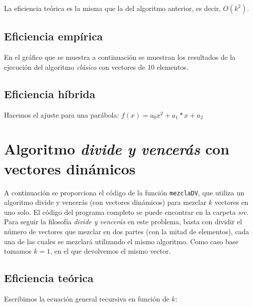 \documentclass[11pt]{article}
\begin{document}
 La eficiencia teórica es la misma que la del algoritmo anterior, es decir, $O(k^2)$.
 
 \subsection*{Eficiencia empírica}
 
 En el gráfico que se muestra a continuación se muestran los resultados de la
 ejecución del algoritmo \textit{clásico} con vectores de 10 elementos.
 
 \begin{center}
 	
 \end{center}
 
 \subsection*{Eficiencia híbrida}
 
 Hacemos el ajuste para una parábola: $f(x) = a_{0}x^{2}+a_{1}*x + a_{2}$
 \begin{center}
 	
 \end{center}

\section*{Algoritmo \textit{divide y vencerás} con vectores dinámicos}

A continuación se proporciona el código de la función \texttt{mezclaDV},
que utiliza un algoritmo divide y vencerás (con vectores dinámicos) para mezclar $k$ vectores en uno solo. El
código del programa completo se puede encontrar en la carpeta \textit{src}.\\
Para seguir la filosofía \textit{divide y vencerás} en este problema, basta con dividir el número de vectores que mezclar en dos partes (con la mitad de elementos), cada una de las cuales se mezclará utilizando el mismo algoritmo. Como caso base tomamos $k=1$, en el que devolvemos el mismo vector.\\



\subsection*{Eficiencia teórica}

Escribimos la ecuación general recursiva en función de $k$:
\end{document}
